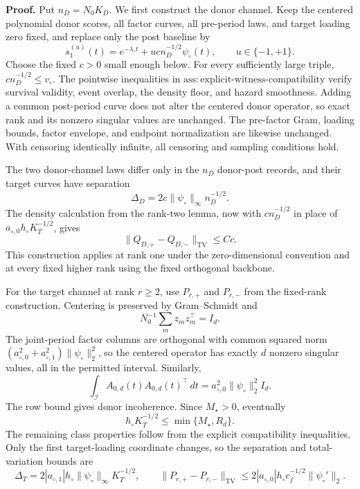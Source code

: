 \textbf{Proof.}
Put \(n_D=N_0K_D\). We first construct the donor channel. Keep the centered polynomial donor scores, all factor curves, all pre-period laws, and target loading zero fixed, and replace only the post baseline by
\[
 s_1^{(u)}(t)=e^{-\lambda_\circ t}+ucn_D^{-1/2}\psi_\circ(t),
 \qquad u\in\{-1,+1\}.
\]
Choose the fixed \(c>0\) small enough below. For every sufficiently large triple, \(cn_D^{-1/2}\le v_\circ\). The pointwise inequalities in \(\mathrm{ass:explicit\mbox{-}witness\mbox{-}compatibility}\) verify survival validity, event overlap, the density floor, and hazard smoothness. Adding a common post-period curve does not alter the centered donor operator, so exact rank and its nonzero singular values are unchanged. The pre-factor Gram, loading bounds, factor envelope, and endpoint normalization are likewise unchanged. With censoring identically infinite, all censoring and sampling conditions hold.

The two donor-channel laws differ only in the \(n_D\) donor-post records, and their target curves have separation
\[
 \Delta_D=2c\|\psi_\circ\|_\infty n_D^{-1/2}.
\]
The density calculation from the rank-two lemma, now with \(cn_D^{-1/2}\) in place of \(a_{\circ,0}h_\circ K_T^{-1/2}\), gives
\[
 \|Q_{D,+}-Q_{D,-}\|_{\mathrm{TV}}\le Cc.
\]
This construction applies at rank one under the zero-dimensional convention and at every fixed higher rank using the fixed orthogonal backbone.

For the target channel at rank \(r\ge2\), use \(P_{r,+}\) and \(P_{r,-}\) from the fixed-rank construction. Centering is preserved by Gram--Schmidt and
\[
 N_0^{-1}\sum_mz_mz_m^\top=I_d.
\]
The joint-period factor columns are orthogonal with common squared norm \((a_{\circ,0}^2+a_{\circ,1}^2)\|\psi_\circ\|_2^2\), so the centered operator has exactly \(d\) nonzero singular values, all in the permitted interval. Similarly,
\[
 \int_{\mathcal I}A_{0,d}(t)A_{0,d}(t)^\top\,dt
 =a_{\circ,0}^2\|\psi_\circ\|_2^2I_d.
\]
The row bound gives donor incoherence. Since \(M_\star>0\), eventually
\[
 h_\circ K_T^{-1/2}\le\min\{M_\star,R_d\}.
\]
The remaining class properties follow from the explicit compatibility inequalities. Only the first target-loading coordinate changes, so the separation and total-variation bounds are
\[
 \Delta_T=2|a_{\circ,1}|h_\circ\|\psi_\circ\|_\infty K_T^{-1/2},
 \qquad
 \|P_{r,+}-P_{r,-}\|_{\mathrm{TV}}
 \le2|a_{\circ,0}|h_\circ c_f^{-1/2}\|\psi_\circ'\|_2.
\]

